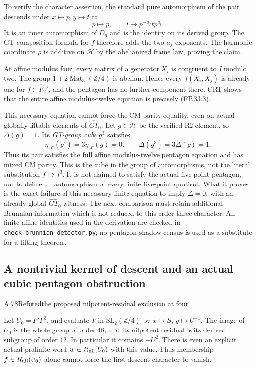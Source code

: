To verify the character assertion, the standard pure automorphism of
the pair descends under $x\mapsto p,y\mapsto t$ to
\[
 p\longmapsto p,\qquad
 t\longmapsto p^{-a_f}tp^{a_f}.
\]
It is an inner automorphism of $D_6$ and is the identity on its
derived group. The GT composition formula for $f$ therefore adds
the two $a_f$ exponents. The harmonic coordinate $\rho$ is additive
on $\mathcal H$ by the abelianized frame law, proving the claim.

At affine modulus four, every matrix of a generator $X_i$ is
congruent to $I$ modulo two. The group
$1+2\operatorname{Mat}_3(\mathbb Z/4)$ is abelian. Hence every
$f(X_i,X_j)$ is already one for $f\in\widehat F_2'$, and the
pentagon has no further component there. CRT shows that the entire
affine modulus-twelve equation is precisely (FP.33.3).

This necessary equation cannot force the CM parity equality, even on
actual globally liftable elements of $\widehat{GT}_0$.
Let $g\in\mathcal H$ be the verified R2 element, so
$\Delta(g)=1$. Its \emph{GT-group cube} $g^3$ satisfies
\[
 \eta_{\mathrm{aff}}(g^3)=3\eta_{\mathrm{aff}}(g)=0,
 \qquad \Delta(g^3)=3\Delta(g)=1.
 \tag{FP.33.5}
\]
Thus its pair satisfies the full affine modulus-twelve pentagon
equation and has mixed CM parity. This is the cube in the group of
automorphisms, not the literal substitution $f\mapsto f^3$.
It is not claimed to satisfy the actual five-point pentagon, nor to
define an automorphism of every finite five-point quotient. What it
proves is the exact failure of this necessary finite equation to
imply $\Delta=0$, with an already global $\widehat{GT}_0$ witness.
The next comparison must retain additional Brunnian information
which is not reduced to this order-three character.
All finite affine identities used in the derivation are checked in
\texttt{check\_brunnian\_detector.py}; no pentagon-shadow census is
used as a substitute for a lifting theorem.

\subsection{A nontrivial kernel of descent and an actual cubic pentagon obstruction}


\begin{statement}{A.78}{Refuted}{the proposed nilpotent-residual exclusion at four}
\end{statement}
Let $U_0=F'F^3$, and evaluate $F$ in
$\mathrm{SL}_2(\mathbb Z/4)$ by $x\mapsto S$, $y\mapsto U^{-1}$.
The image of $U_0$ is the whole group of order $48$, and its
nilpotent residual is its derived subgroup of order $12$.
In particular it contains $-U^2$. There is even an explicit
actual profinite word $w\in R_{\rm nil}(U_0)$ with this value.
Thus membership $f\in R_{\rm nil}(U_0)$ alone cannot force
the first descent character to vanish.

